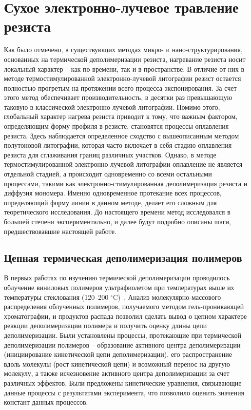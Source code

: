 \section{Сухое электронно-лучевое травление резиста}

Как было отмечено, в существующих методах микро- и нано-структурирования, основанных на термической деполимеризации резиста, нагревание резиста носит локальный характер -- как по времени, так и в пространстве. В отличие от них в методе термостимулированной электронно-лучевой литографии резист остается полностью прогретым на протяжении всего процесса экспонирования. За счет этого метод обеспечивает производительность, в десятки раз превышающую таковую в классической электронно-лучевой литографии. Помимо этого, глобальный характер нагрева резиста приводит к тому, что важным фактором, определяющим форму профиля в резисте, становятся процессы оплавления резиста. Здесь наблюдается определенное сходство с вышеописанным методом полутоновой литографии, которая часто включает в себя стадию оплавления резиста для сглаживания границ различных участков. Однако, в методе термостимулированной электронно-лучевой литографии оплавление не является отдельной стадией, а происходит одновременно со всеми остальными процессами, такими как электронно-стимулированная деполимеризация резиста и диффузия мономера. Именно одновременное протекание всех процессов, определяющий форму линии в данном методе, делает его сложным для теоретического исследования. До настоящего времени метод исследовался в большей степени экспериментально, и далее будут подробно описаны шаги, предшествовавшие настоящей работе.


\subsection{Цепная термическая деполимеризация полимеров}
В первых работах по изучению термической деполимеризации проводилось облучение виниловых полимеров ультрафиолетом при температурах выше их температуры стеклования (120--200 $^\circ$C)~\cite{Cowley_1952_1, Cowley_1952_2, Grassie1949_1, Grassie1949_2, Grassie1949_3, Grassie1949_4}. Анализ молекулярно-массового распределения облученных полимеров, получаемого методом гель-проникающей хроматографии, и продуктов распада позволил сделать вывод о цепном характере реакции деполимеризации полимера и получить оценку длины цепи деполимеризации. Были установлены процессы, протекающие при термической деполимеризации полимеров -- образование активного центра деполимеризации (инициирование кинетической цепи деполимеризации), его распространение вдоль молекулы (рост кинетической цепи) и возможный перенос на другую молекулу, а также исчезновение активного центра деполимеризации за счет различных эффектов. Были предложены кинетические уравнения, связывающие данные процессы с результатами эксперимента, что позволило оценить значения констант данных процессов.

